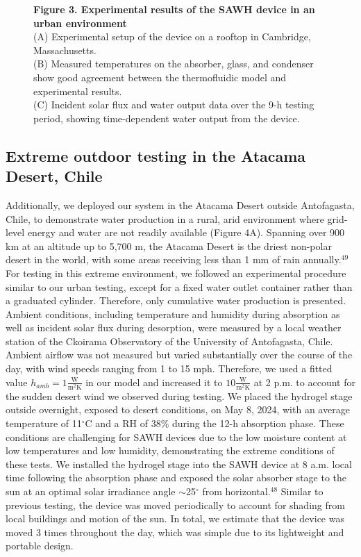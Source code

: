 \documentclass[11pt]{article}
\newcommand{\figbox}[1]{%
  \fbox{\parbox[c][#1][c]{0.92\textwidth}{\centering\itshape [figure image]}}}
\begin{document}
\begin{figure}[!ht]
\centering
\figbox{6.5cm}
\caption*{\textbf{Figure 3. Experimental results of the SAWH device in an urban environment}\\
(A) Experimental setup of the device on a rooftop in Cambridge, Massachusetts.\\
(B) Measured temperatures on the absorber, glass, and condenser show good agreement between the thermofluidic model and experimental results.\\
(C) Incident solar flux and water output data over the 9-h testing period, showing time-dependent water output from the device.}
\end{figure}

\subsection{Extreme outdoor testing in the Atacama Desert, Chile}

Additionally, we deployed our system in the Atacama Desert outside Antofagasta, Chile, to demonstrate water production in a rural, arid environment where grid-level energy and water are not readily available (Figure 4A). Spanning over 900 km at an altitude up to 5,700 m, the Atacama Desert is the driest non-polar desert in the world, with some areas receiving less than 1 mm of rain annually.$^{49}$ For testing in this extreme environment, we followed an experimental procedure similar to our urban testing, except for a fixed water outlet container rather than a graduated cylinder. Therefore, only cumulative water production is presented. Ambient conditions, including temperature and humidity during absorption as well as incident solar flux during desorption, were measured by a local weather station of the Ckoirama Observatory of the University of Antofagasta, Chile. Ambient airflow was not measured but varied substantially over the course of the day, with wind speeds ranging from 1 to 15 mph. Therefore, we used a fitted value $h_{amb} = 1 \frac{\mathrm{W}}{\mathrm{m^{2}K}}$ in our model and increased it to $10 \frac{\mathrm{W}}{\mathrm{m^{2}K}}$ at 2 p.m. to account for the sudden desert wind we observed during testing. We placed the hydrogel stage outside overnight, exposed to desert conditions, on May 8, 2024, with an average temperature of 11$^{\circ}$C and a RH of 38\% during the 12-h absorption phase. These conditions are challenging for SAWH devices due to the low moisture content at low temperatures and low humidity, demonstrating the extreme conditions of these tests. We installed the hydrogel stage into the SAWH device at 8 a.m. local time following the absorption phase and exposed the solar absorber stage to the sun at an optimal solar irradiance angle $\sim$25$^{\circ}$ from horizontal.$^{48}$ Similar to previous testing, the device was moved periodically to account for shading from local buildings and motion of the sun. In total, we estimate that the device was moved 3 times throughout the day, which was simple due to its lightweight and portable design.
\end{document}
